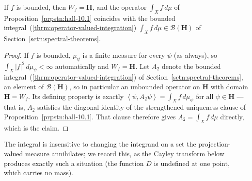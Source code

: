 \begin{proposition}
    \label{prpstn:coincidence-with-the-bounded-integral}
    \leanok
    If $f$ is bounded, then $W_f = \mathbf{H}$, and the operator $\int_X f \, d\mu$ of Proposition~\ref{prpstn:hall-10.1} coincides with the bounded integral~(\ref{thrm:operator-valued-integration}) $\int_X f \, d\mu \in \mathcal{B}(\mathbf{H})$ of Section~\ref{sctn:spectral-theorems}.
\end{proposition}
\begin{proof}
    \leanok
If $f$ is bounded, $\mu_\psi$ is a finite measure for every $\psi$ (as always), so $\int_X \lvert f \rvert^2 \, d\mu_\psi < \infty$ automatically and $W_f = \mathbf{H}$. Let $A_2$ denote the bounded integral~(\ref{thrm:operator-valued-integration}) of Section~\ref{sctn:spectral-theorems}, an element of $\mathcal{B}(\mathbf{H})$, so in particular an unbounded operator on $\mathbf{H}$ with domain $\mathbf{H} = W_f$. Its defining property is exactly $\left< \psi, A_2\psi \right> = \int_X f \, d\mu_\psi$ for all $\psi \in \mathbf{H}$ — that is, $A_2$ satisfies the diagonal identity of the strengthened uniqueness clause of Proposition~\ref{prpstn:hall-10.1}. That clause therefore gives $A_2 = \int_X f \, d\mu$ directly, which is the claim.
\end{proof}

The integral is insensitive to changing the integrand on a set the projection-valued measure annihilates; we record this, as the Cayley transform below produces exactly such a situation (the function $D$ is undefined at one point, which carries no mass).

